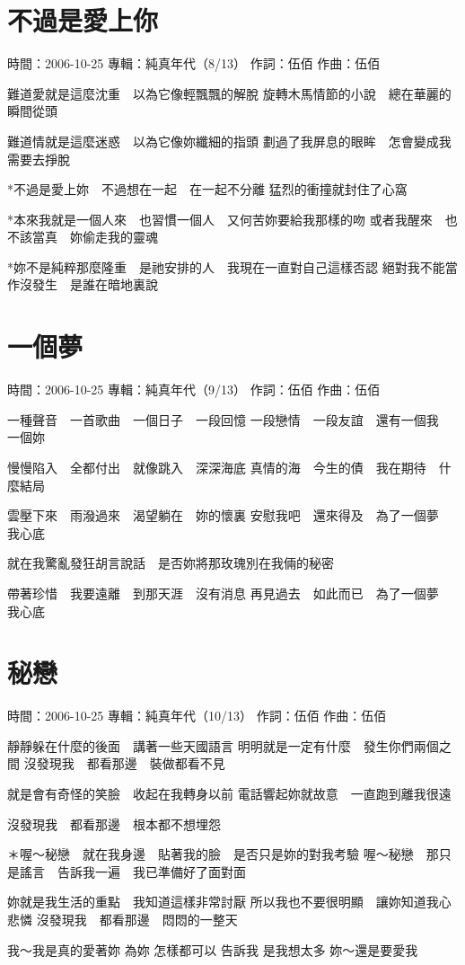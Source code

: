\documentclass[UTF8,a4paper,oneside,twocolumn,12pt]{ctexbook}
\newcommand{\infopair}[2]{\textbullet #1：#2}
\newcommand{\zc}[1][伍佰]{\infopair{作詞}{#1}}
\newcommand{\zq}[1][伍佰]{\infopair{作曲}{#1}}
\newcommand{\zj}[1]{\infopair{專輯}{#1}}
\newcommand{\sj}[1]{\infopair{時間}{#1}}
\newenvironment{info}{\begin{flushleft}\kaishu
	}
	{\end{flushleft}\normalsize\yahei\par}
\newenvironment{lyric}{
	}
{}
\begin{document}
\section{不過是愛上你}
\begin{info}
	\sj{2006-10-25}
	\zj{純真年代（8/13）}
	\zc
	\zq
\end{info}
\begin{lyric}
	難道愛就是這麼沈重　以為它像輕飄飄的解脫
	旋轉木馬情節的小說　總在華麗的瞬間從頭

	難道情就是這麼迷惑　以為它像妳纖細的指頭
	劃過了我屏息的眼眸　怎會變成我需要去掙脫

	*不過是愛上妳　不過想在一起　在一起不分離
	猛烈的衝撞就封住了心窩

	*本來我就是一個人來　也習慣一個人　又何苦妳要給我那樣的吻
	或者我醒來　也不該當真　妳偷走我的靈魂

	*妳不是純粹那麼隆重　是祂安排的人　我現在一直對自己這樣否認
	絕對我不能當作沒發生　是誰在暗地裏說
\end{lyric}

\section{一個夢}
\begin{info}
	\sj{2006-10-25}
	\zj{純真年代（9/13）}
	\zc
	\zq
\end{info}
\begin{lyric}
	一種聲音　一首歌曲　一個日子　一段回憶
	一段戀情　一段友誼　還有一個我　一個妳

	慢慢陷入　全都付出　就像跳入　深深海底
	真情的海　今生的債　我在期待　什麼結局

	雲壓下來　雨潑過來　渴望躺在　妳的懷裏
	安慰我吧　還來得及　為了一個夢　我心底

	就在我驚亂發狂胡言說話　是否妳將那玫瑰別在我倆的秘密

	帶著珍惜　我要遠離　到那天涯　沒有消息
	再見過去　如此而已　為了一個夢　我心底
\end{lyric}

\section{秘戀}
\begin{info}
	\sj{2006-10-25}
	\zj{純真年代（10/13）}
	\zc
	\zq
\end{info}
\begin{lyric}
	靜靜躲在什麼的後面　講著一些天國語言
	明明就是一定有什麼　發生你們兩個之間
	沒發現我　都看那邊　裝做都看不見

	就是會有奇怪的笑臉　收起在我轉身以前
	電話響起妳就故意　一直跑到離我很遠

	沒發現我　都看那邊　根本都不想埋怨

	＊喔～秘戀　就在我身邊　貼著我的臉　是否只是妳的對我考驗
	喔～秘戀　那只是謠言　告訴我一遍　我已準備好了面對面

	妳就是我生活的重點　我知道這樣非常討厭
	所以我也不要很明顯　讓妳知道我心悲憐
	沒發現我　都看那邊　悶悶的一整天

	我～我是真的愛著妳
	為妳 怎樣都可以
	告訴我 是我想太多
	妳～還是要愛我
\end{lyric}
\end{document}
